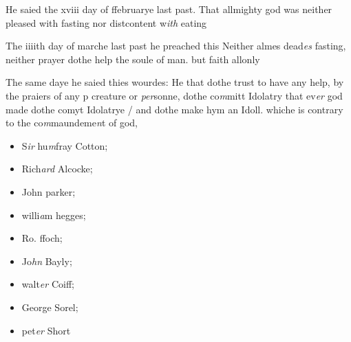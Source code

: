 \documentclass[12pt, a4paper]{book}
\begin{document}
               	
               	
               		
				\marginpar[\vspace{0.5cm}{\textcolor{Gray}{fastynge}}]{}
			
               		
		\ifthenelse{\isodd{\thepage}}
		{\reversemarginpar}
		{\normalmarginpar}
		He saied the xviii day of ffebruarye last past. That allmighty god was neither pleased 
			with fasting nor distcontent w\textit{ith} eating
               	
               		
			
               		
		\ifthenelse{\isodd{\thepage}}
		{\reversemarginpar}
		{\normalmarginpar}
		The iiiith day of marche last past he preached this
 Neither almes dead\textit{es} fasting, neither prayer
 dothe help the soule of man. but faith allonly
               	
               	
			
			
               		
				\marginpar[\vspace{0.5cm}{\textcolor{Gray}{seditious}}]{}
			
               		
		\ifthenelse{\isodd{\thepage}}
		{\reversemarginpar}
		{\normalmarginpar}
		The same daye he saied thies wourdes: He that
 dothe trust to have any help, by the praiers of any
 p creature or \textit{per}sonne, dothe co\textit{m}mitt Idolatry that
 ev\textit{er} god made dothe comyt Idolatrye / and dothe
 make hym an Idoll. whiche is contrary to the
 co\textit{m}maundeme\textit{n}t of god,
               	
               		
               			\begin{itemize}
               				\item[]S\textit{ir} hu\textit{m}fray Cotton;
               				\item[]Rich\textit{ard} Alcocke;
               				\item[]John parker;
               				\item[]willi\textit{a}m hegges;
               				\item[]Ro. ffoch; 
               				\item[]Jo\textit{hn} Bayly;
               				\item[]walt\textit{er} Coiff;
               				\item[]George Sorel;
               				\item[]pet\textit{er} Short
               			\end{itemize}
               			
\end{document}
